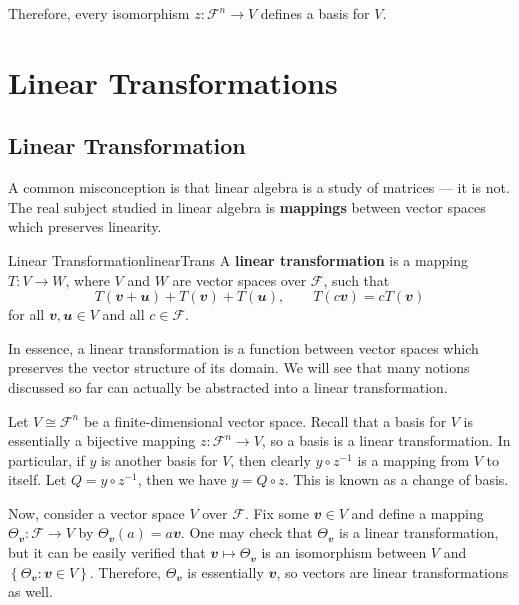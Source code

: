 \documentclass[math, code]{amznotes}
\theoremstyle{remark}
\begin{document}
Therefore, every isomorphism $z \colon \mathcal{F}^n \to V$ defines a basis for $V$.
\chapter{Linear Transformations}
\section{Linear Transformation}
A common misconception is that linear algebra is a study of matrices --- it is not. The real subject studied in linear algebra is \textbf{mappings} between vector spaces which preserves linearity.
\begin{dfnbox}{Linear Transformation}{linearTrans}
    A {\color{red} \textbf{linear transformation}} is a mapping $T \colon V \to W$, where $V$ and $W$ are vector spaces over $\mathcal{F}$, such that
    \begin{equation*}
        T(\mathbfit{v + u}) + T(\mathbfit{v}) + T(\mathbfit{u}), \qquad T(c\mathbfit{v}) = cT(\mathbfit{v})
    \end{equation*}
    for all $\mathbfit{v}, \mathbfit{u} \in V$ and all $c \in \mathcal{F}$.
\end{dfnbox}
In essence, a linear transformation is a function between vector spaces which preserves the vector structure of its domain. We will see that many notions discussed so far can actually be abstracted into a linear transformation.

Let $V \cong \mathcal{F}^n$ be a finite-dimensional vector space. Recall that a basis for $V$ is essentially a bijective mapping $z \colon \mathcal{F}^n \to V$, so a basis is a linear transformation. In particular, if $y$ is another basis for $V$, then clearly $y \circ z^{-1}$ is a mapping from $V$ to itself. Let $Q = y \circ z^{-1}$, then we have $y = Q \circ z$. This is known as a change of basis.

Now, consider a vector space $V$ over $\mathcal{F}$. Fix some $\mathbfit{v} \in V$ and define a mapping $\Theta_{\mathbfit{v}} \colon \mathcal{F} \to V$ by $\Theta_{\mathbfit{v}}(a) = a\mathbfit{v}$. One may check that $\Theta_{\mathbfit{v}}$ is a linear transformation, but it can be easily verified that $\mathbfit{v} \mapsto \Theta_{\mathbfit{v}}$ is an isomorphism between $V$ and $\left\{\Theta_{\mathbfit{v}} \colon \mathbfit{v} \in V\right\}$. Therefore, $\Theta_{\mathbfit{v}}$ is essentially $\mathbfit{v}$, so vectors are linear transformations as well.
\end{document}
